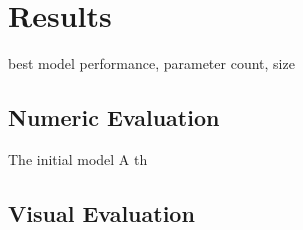 \section{Results}

best model performance, parameter count, size

\subsection{Numeric Evaluation}

The initial model A th

\subsection{Visual Evaluation}


\newpage